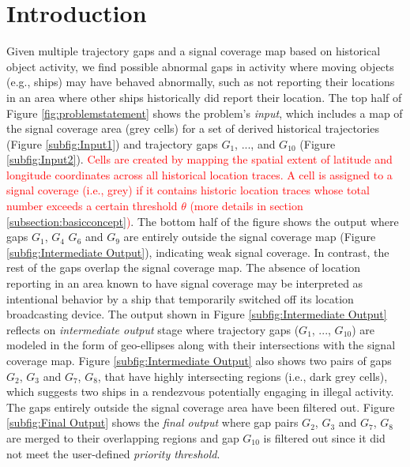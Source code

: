 \documentclass[acmsmall]{acmart}
\begin{document}
\section{Introduction}
Given multiple trajectory gaps and a signal coverage map based on historical object activity, we find possible abnormal gaps in activity where moving objects (e.g., ships) may have behaved abnormally, such as not reporting their locations in an area where other ships historically did report their location. The top half of Figure \ref{fig:problemstatement} shows the problem's \textit{input}, which includes a map of the signal coverage area (grey cells) for a set of derived historical trajectories (Figure  \ref{subfig:Input1}) and trajectory gaps $G_{1}$, ..., and $G_{10}$ (Figure \ref{subfig:Input2}). \textcolor{red}{Cells are created by mapping the spatial extent of latitude and longitude coordinates across all historical location traces. A cell is assigned to a signal coverage (i.e., grey) if it contains historic location traces whose total number exceeds a certain threshold $\theta$ (more details in section \ref{subsection:basicconcept})}. The bottom half of the figure shows the output where gaps $G_{1}$, $G_{4}$ $G_{6}$ and $G_{9}$ are entirely outside the signal coverage map (Figure \ref{subfig:Intermediate Output}), indicating weak signal coverage. In contrast, the rest of the gaps overlap the signal coverage map. The absence of location reporting in an area known to have signal coverage may be interpreted as intentional behavior by a ship that temporarily switched off its location broadcasting device. The output shown in Figure \ref{subfig:Intermediate Output} reflects on \textit{intermediate output} stage where trajectory gaps ($G_{1}$, ..., $G_{10}$) are modeled in the form of geo-ellipses \cite{pfoser1999capturing,miller1991modelling} along with their intersections with the signal coverage map. Figure \ref{subfig:Intermediate Output} also shows two pairs of gaps $G_{2}$, $G_{3}$ and $G_{7}$, $G_{8}$, that have highly intersecting regions (i.e., dark grey cells), which suggests two ships in a rendezvous potentially engaging in illegal activity. The gaps entirely outside the signal coverage area have been filtered out. Figure \ref{subfig:Final Output} shows the \textit{final output} where gap pairs $G_{2}$, $G_{3}$ and $G_{7}$, $G_{8}$ are merged to their overlapping regions and gap $G_{10}$ is filtered out since it did not meet the user-defined \textit{priority threshold}.
\end{document}
